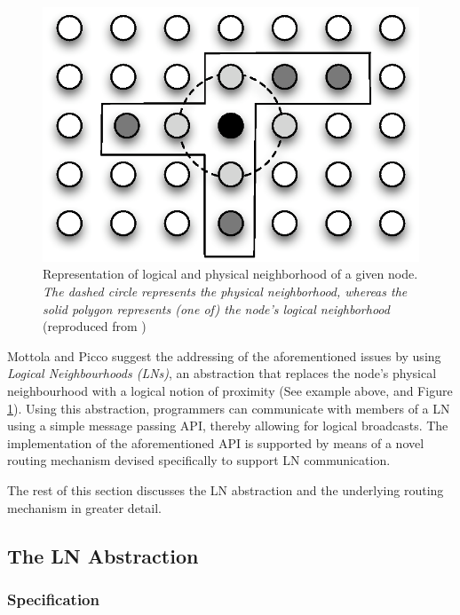 \begin{figure} 
\centering
\includegraphics[scale=0.71]{img/LN_physical_vs_logical.eps} 
\caption[Difference between physical and logical neighborhoods]{Representation 
of logical and physical neighborhood of a given node. \emph{The dashed circle 
represents the physical neighborhood, whereas the solid polygon represents (one 
of) the node's logical neighborhood} (reproduced from
\cite{mottola_LN:2006})}
\label{Fig:LN_physical_vs_logical}
\end{figure} 

Mottola and Picco \cite{mottola_LN:2006} suggest the addressing of the
aforementioned issues by using \emph{Logical Neighbourhoods (LNs)}, an abstraction
that replaces the node's physical neighbourhood with a logical notion of
proximity (See example above, and Figure \ref{Fig:LN_physical_vs_logical}). Using this abstraction, programmers
can communicate
with members of a LN using a simple message passing API,
thereby allowing for logical broadcasts. The implementation of the aforementioned API is
supported by means of a novel routing mechanism devised specifically to support
LN communication.

The rest of this section discusses the LN abstraction and the
underlying routing mechanism in greater detail.

\subsection{The LN Abstraction}

\subsubsection{Specification}

